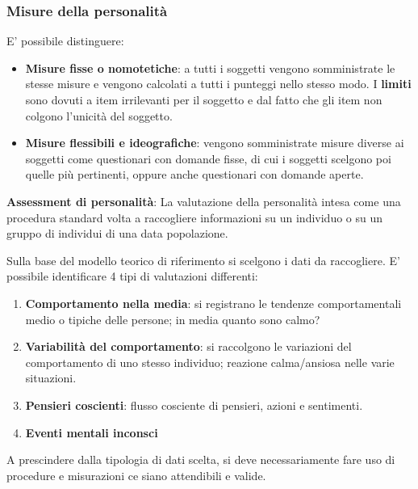 \documentclass{subfiles}
\begin{document}
\subsubsection*{Misure della personalità}

    E' possibile distinguere: 
    \begin{itemize}
        \item \textbf{Misure fisse o nomotetiche}: a tutti i soggetti vengono somministrate le stesse 
        misure e vengono calcolati a tutti i punteggi nello stesso modo. I \textbf{limiti} sono dovuti 
        a item irrilevanti per il soggetto e dal fatto che gli item non colgono l'unicità del soggetto. 
        \item \textbf{Misure flessibili e ideografiche}: vengono somministrate misure diverse ai 
        soggetti come questionari con domande fisse, di cui i soggetti scelgono poi quelle più 
        pertinenti, oppure anche questionari con domande aperte.
    \end{itemize}

    \begin{mdframed}
    \textbf{Assessment di personalità}: La valutazione della personalità intesa come una procedura 
    standard volta a raccogliere informazioni su un individuo o su un gruppo di individui di una 
    data popolazione.
    \end{mdframed}

    Sulla base del modello teorico di riferimento si scelgono i dati da raccogliere.
    E' possibile identificare 4 tipi di valutazioni differenti: 
    \begin{enumerate}
        \item \textbf{Comportamento nella media}: si registrano le tendenze comportamentali medio o 
        tipiche delle persone; in media quanto sono calmo?
        \item \textbf{Variabilità del comportamento}: si raccolgono le variazioni del comportamento 
        di uno stesso individuo; reazione calma/ansiosa nelle varie situazioni.
        \item \textbf{Pensieri coscienti}: flusso cosciente di pensieri, azioni e sentimenti. 
        \item \textbf{Eventi mentali inconsci}
    \end{enumerate}

    A prescindere dalla tipologia di dati scelta, si deve necessariamente fare uso di procedure e 
    misurazioni ce siano attendibili e valide. 
\end{document}
